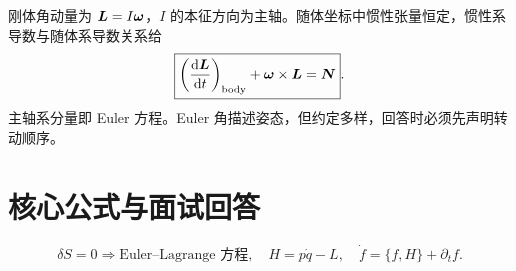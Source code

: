 刚体角动量为 $\bm{L}=I\bm{\omega}$，$I$ 的本征方向为主轴。随体坐标中惯性张量恒定，惯性系导数与随体系导数关系给
\[
\boxed{\left(\frac{\mathrm d \bm{L}}{\mathrm d t}\right)_{\rm body}+\bm{\omega}\times\bm{L}=\bm{N}}.
\]
主轴系分量即 Euler 方程。Euler 角描述姿态，但约定多样，回答时必须先声明转动顺序。

\section{核心公式与面试回答}
\[
\delta S=0\Rightarrow\text{Euler--Lagrange 方程},\quad
H=p\dot q-L,\quad \dot f=\{f,H\}+\partial_t f.
\]
